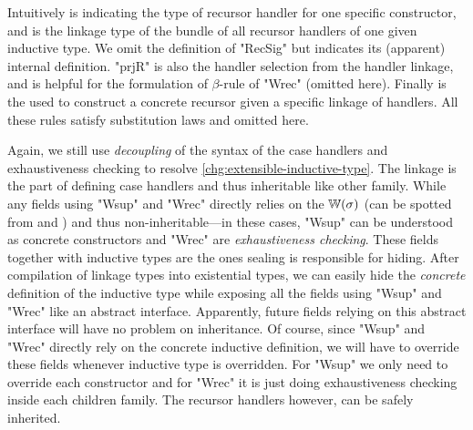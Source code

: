 Intuitively  is indicating the type of recursor handler
for one specific constructor, and  is the linkage type
of the bundle of all recursor handlers of one given inductive type. We
omit the definition of "RecSig" but  indicates its
(apparent) internal definition. "prjR" is also the handler selection
from the handler linkage, and is helpful for the formulation of
$\beta$-rule of "Wrec" (omitted here). Finally  is
the used to construct a concrete recursor given a specific linkage of
handlers. All these rules satisfy substitution laws and omitted here.

Again, we still use \textit{decoupling} of the syntax of the case handlers and exhaustiveness checking to resolve \ref{chg:extensible-inductive-type}. The linkage is the part of defining case handlers and thus inheritable like other family.
While any fields using "Wsup" and "Wrec" directly relies on the
${\mathbb{W}}(\sigma)$ (can be spotted from  and
) and thus non-inheritable---in these cases, "Wsup"
can be understood as concrete constructors and "Wrec" are
\textit{exhaustiveness checking}. These fields together with inductive
types are the ones sealing is responsible for hiding. After compilation
of linkage types into existential types, we can easily hide the
\textit{concrete} definition of the inductive type while exposing all
the fields using "Wsup" and "Wrec" like an abstract interface.
Apparently, future fields relying on this abstract interface will have no
problem on inheritance.
Of course, since "Wsup" and "Wrec" directly rely on the concrete inductive definition, we will have to override these fields whenever inductive type is overridden. For "Wsup" we only need to override each constructor and for "Wrec" it is just doing exhaustiveness checking inside each children family. The recursor handlers however, can be safely inherited.

